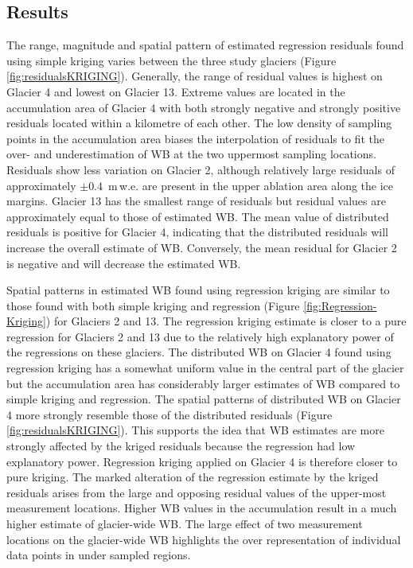 \documentclass{sfuthesis}
\begin{document}
\subsection{Results}

The range, magnitude and spatial pattern of estimated regression residuals found using simple kriging varies between the three study glaciers (Figure \ref{fig:residualsKRIGING}). Generally, the range of residual values is highest on Glacier 4 and lowest on Glacier 13. Extreme values are located in the accumulation area of Glacier 4 with both strongly negative and strongly positive residuals located within a kilometre of each other. The low density of sampling points in the accumulation area biases the interpolation of residuals to fit the over- and underestimation of WB at the two uppermost sampling locations. Residuals show less variation on Glacier 2, although relatively large residuals of approximately $\pm 0.4$ \,m\,w.e. are present in the upper ablation area along the ice margins. Glacier 13 has the smallest range of residuals but residual values are approximately equal to those of estimated WB. The mean value of distributed residuals is positive for Glacier 4, indicating that the distributed residuals will increase the overall estimate of WB. Conversely, the mean residual for Glacier 2 is negative and will decrease the estimated WB. 

Spatial patterns in estimated WB found using regression kriging are similar to those found with both simple kriging and regression (Figure \ref{fig:Regression-Kriging}) for Glaciers 2 and 13. The regression kriging estimate is closer to a pure regression for Glaciers 2 and 13 due to the relatively high explanatory power of the regressions on these glaciers. The distributed WB on Glacier 4 found using regression kriging has a somewhat uniform value in the central part of the glacier but the accumulation area has considerably larger estimates of WB compared to simple kriging and regression. The spatial patterns of distributed WB on Glacier 4 more strongly resemble those of the distributed residuals (Figure \ref{fig:residualsKRIGING}). This supports the idea that WB estimates are more strongly affected by the kriged residuals because the regression had low explanatory power. Regression kriging applied on Glacier 4 is therefore closer to pure kriging. The marked alteration of the regression estimate by the kriged residuals arises from the large and opposing residual values of the upper-most measurement locations. Higher WB values in the accumulation result in a much higher estimate of glacier-wide WB. The large effect of two measurement locations on the glacier-wide WB highlights the over representation of individual data points in under sampled regions.
\end{document}
